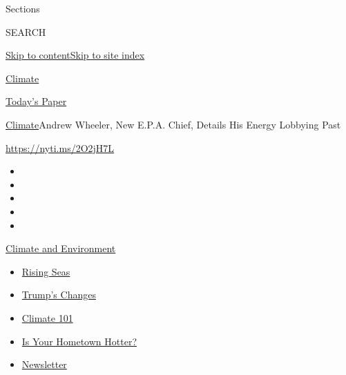 Sections

SEARCH

\protect\hyperlink{site-content}{Skip to
content}\protect\hyperlink{site-index}{Skip to site index}

\href{https://www.nytimes.com/section/climate}{Climate}

\href{https://myaccount.nytimes.com/auth/login?response_type=cookie\&client_id=vi}{}

\href{https://www.nytimes.com/section/todayspaper}{Today's Paper}

\href{/section/climate}{Climate}\textbar{}Andrew Wheeler, New E.P.A.
Chief, Details His Energy Lobbying Past

\url{https://nyti.ms/2O2jH7L}

\begin{itemize}
\item
\item
\item
\item
\item
\end{itemize}

\href{https://www.nytimes.com/section/climate?action=click\&pgtype=Article\&state=default\&region=TOP_BANNER\&context=storylines_menu}{Climate
and Environment}

\begin{itemize}
\tightlist
\item
  \href{https://www.nytimes.com/2020/07/30/climate/sea-level-inland-floods.html?action=click\&pgtype=Article\&state=default\&region=TOP_BANNER\&context=storylines_menu}{Rising
  Seas}
\item
  \href{https://www.nytimes.com/interactive/2020/climate/trump-environment-rollbacks.html?action=click\&pgtype=Article\&state=default\&region=TOP_BANNER\&context=storylines_menu}{Trump's
  Changes}
\item
  \href{https://www.nytimes.com/interactive/2020/04/19/climate/climate-crash-course-1.html?action=click\&pgtype=Article\&state=default\&region=TOP_BANNER\&context=storylines_menu}{Climate
  101}
\item
  \href{https://www.nytimes.com/interactive/2018/08/30/climate/how-much-hotter-is-your-hometown.html?action=click\&pgtype=Article\&state=default\&region=TOP_BANNER\&context=storylines_menu}{Is
  Your Hometown Hotter?}
\item
  \href{https://www.nytimes.com/newsletters/climate-change?action=click\&pgtype=Article\&state=default\&region=TOP_BANNER\&context=storylines_menu}{Newsletter}
\end{itemize}

